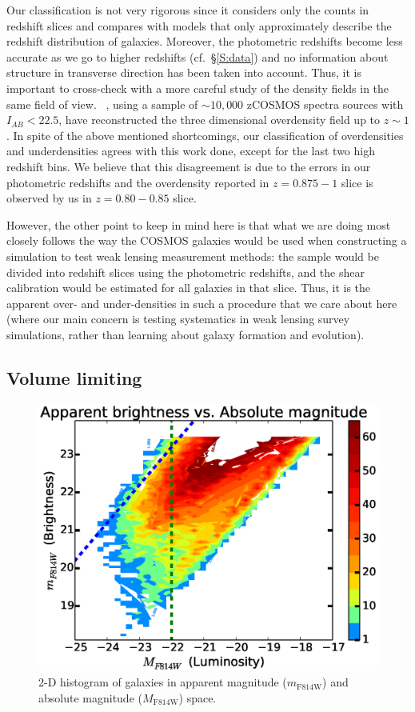 \documentclass[twocolumn,useAMS,usenatbib]{mn2e}
\begin{document}
Our classification is not very rigorous since it considers only the counts in redshift slices and compares with models that only approximately describe the redshift distribution of galaxies.
Moreover, the photometric redshifts become less accurate as we go to higher redshifts (cf.~\S\ref{S:data}) and no information about structure in transverse direction has been taken into account.
Thus, it is important to cross-check with a more careful study of the density fields in the same field of view.
~\cite{Kovac_Density10k}, using a sample of $\sim 10,000$ zCOSMOS spectra sources with $I_{AB}<22.5$, have reconstructed the three dimensional overdensity field up to $z\sim 1$.
In spite of the above mentioned shortcomings, our classification of overdensities and underdensities agrees with this work done, except for the last two high redshift bins.
We believe that this disagreement is due to the errors in our photometric redshifts and the overdensity reported in $z=0.875-1$ slice
is observed by us in $z=0.80-0.85$ slice.

However, the other point to keep in mind here is that what we are
doing most closely follows the way the COSMOS galaxies would be used
when constructing a simulation to test weak lensing measurement
methods: the sample would be divided into redshift slices using the
photometric redshifts, and the shear calibration would be estimated
for all galaxies in that slice.  Thus, it is the apparent over- and
under-densities in such a procedure that we care about here (where our
main concern is testing systematics in weak lensing survey
simulations, rather than learning about galaxy formation and
evolution).

\subsection{Volume limiting}
\label{sub:volumelimiting}
\begin{figure}
  \centering
   \includegraphics[width=\columnwidth]{hist2d_mag_mi}
   \caption{2-D histogram of galaxies in apparent magnitude ($m_\text{F814W}$) and absolute magnitude ($M_\text{F814W}$) space.}
   \label{fig:2Dhist}
\end{figure}
\end{document}
